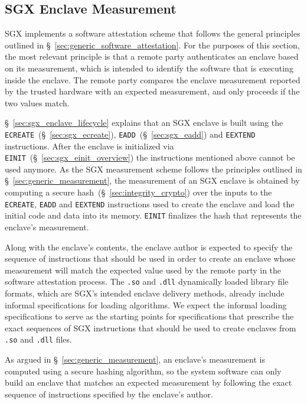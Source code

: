 \subsection{SGX Enclave Measurement}
\label{sec:sgx_measurement}
\label{sec:sgx_mrenclave}

SGX implements a software attestation scheme that follows the general
principles outlined in \S~\ref{sec:generic_software_attestation}. For the
purposes of this section, the most relevant principle is that a remote party
authenticates an enclave based on its measurement, which is intended to
identify the software that is executing inside the enclave. The remote party
compares the enclave measurement reported by the trusted hardware with an
expected measurement, and only proceeds if the two values match.


\S~\ref{sec:sgx_enclave_lifecycle} explains that an SGX enclave is built using
the \texttt{ECREATE}~(\S~\ref{sec:sgx_ecreate}),
\texttt{EADD}~(\S~\ref{sec:sgx_eadd}) and \texttt{EEXTEND} instructions.
After the enclave is initialized via
\texttt{EINIT}~(\S~\ref{sec:sgx_einit_overview}) the instructions mentioned
above cannot be used anymore. As the SGX measurement scheme follows the
principles outlined in \S~\ref{sec:generic_measurement}, the measurement of an
SGX enclave is obtained by computing a secure
hash~(\S~\ref{sec:integrity_crypto}) over the inputs to the \texttt{ECREATE},
\texttt{EADD} and \texttt{EEXTEND} instructions used to create the enclave and
load the initial code and data into its memory. \texttt{EINIT} finalizes the
hash that represents the enclave's measurement.

Along with the enclave's contents, the enclave author is expected to specify
the sequence of instructions that should be used in order to create an enclave
whose measurement will match the expected value used by the remote party in the
software attestation process. The \texttt{.so} and \texttt{.dll} dynamically
loaded library file formats, which are SGX's intended enclave delivery methods,
already include informal specifications for loading algorithms. We expect the
informal loading specifications to serve as the starting points for
specifications that prescribe the exact sequences of SGX instructions that
should be used to create enclaves from \texttt{.so} and \texttt{.dll} files.

As argued in \S~\ref{sec:generic_measurement}, an enclave's measurement is
computed using a secure hashing algorithm, so the system software can only
build an enclave that matches an expected measurement by following the exact
sequence of instructions specified by the enclave's author.

